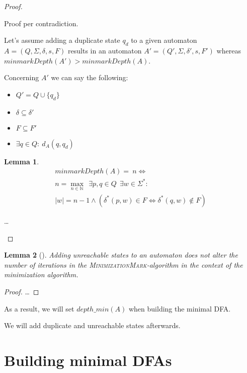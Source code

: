 \documentclass[a4paper, oneside, 11pt]{report}
\newtheorem{lemma}{Lemma}
\theoremstyle{definition}
\theoremstyle{remark}
\newcommand{\MinMark}{\textsc{MinimizationMark}}
\begin{document}
\begin{proof}
	\begin{description}
		\item
		
		Proof per contradiction.
		
		Let's assume adding a duplicate state $q_d$ to a given automaton $A = (Q, \Sigma, \delta, s, F)$ results in an automaton $A' = (Q', \Sigma, \delta', s, F')$ whereas $minmarkDepth(A') > minmarkDepth(A)$.
		
		Concerning $A'$ we can say the following:
		\begin{itemize}
			\item $Q' = Q \cup \{ q_d \}$
			\item $\delta \subseteq \delta'$
			\item $F \subseteq F'$
			\item $\exists q \in Q \colon\ d_A(q, q_d)$
		\end{itemize}
		
		\begin{lemma}
			\begin{multline*}
				minmarkDepth(A) =\ n \Leftrightarrow \\
				n = \max_{n \in \mathbb{N}}\ \ \exists p, q \in Q\ \ \exists w \in \Sigma^* \colon \\
				|w| = n - 1 \land (\delta^*(p,w) \in F \Leftrightarrow \delta^*(q,w) \notin F)
			\end{multline*}
		\end{lemma}
	
		\ldots
	\end{description}
\end{proof}

\begin{lemma}[]
	Adding unreachable states to an automaton does not alter the number of iterations in the \MinMark-algorithm in the context of the minimization algorithm.
\end{lemma}

\begin{proof}
	\ldots
\end{proof}

As a result, we will set $depth\_min(A)$ when building the minimal DFA.

We will add duplicate and unreachable states afterwards.


\chapter{Building minimal DFAs}
\end{document}
